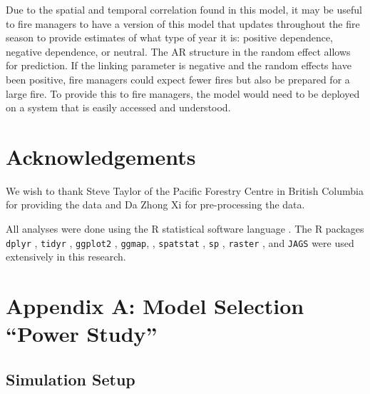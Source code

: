 \documentclass[10pt,letterpaper]{article}
\begin{document}
Due to the spatial and temporal correlation found in this model, it may
be useful to fire managers to have a version of this model that updates
throughout the fire season to provide estimates of what type of year it
is: positive dependence, negative dependence, or neutral. The AR
structure in the random effect allows for prediction. If the linking
parameter is negative and the random effects have been positive, fire
managers could expect fewer fires but also be prepared for a large fire.
To provide this to fire managers, the model would need to be deployed on
a system that is easily accessed and understood.

\hypertarget{acknowledgements}{%
\section{Acknowledgements}\label{acknowledgements}}

We wish to thank Steve Taylor of the Pacific Forestry Centre in
British Columbia for providing the data and Da Zhong Xi for
pre-processing the data.

All analyses were done using the R statistical software language
\cite{rcoreteamLanguageEnvironmentStatistical2019}. The R packages
\texttt{dplyr} \cite{Wickham}, \texttt{tidyr} \cite{Wickham2018},
\texttt{ggplot2} \cite{Wickham2016}, \texttt{ggmap}, \cite{Kahle2013},
\texttt{spatstat} \cite{baddeleySpatstatPackageAnalyzing2005},
\texttt{sp} \cite{pebesmaClassesMethodsSpatial2005}, \texttt{raster}
\cite{hijmansRasterGeographicData2019}, and \texttt{JAGS}
\cite{plummerJAGSProgramAnalysis2003} were used extensively in this
research.

\hypertarget{appendix-b-model-selection-power-study}{%
\section{Appendix A: Model Selection ``Power
Study''}\label{appendix-b-model-selection-power-study}}


\hypertarget{simulation-setup}{%
\subsection{Simulation Setup}\label{simulation-setup}}
\end{document}
